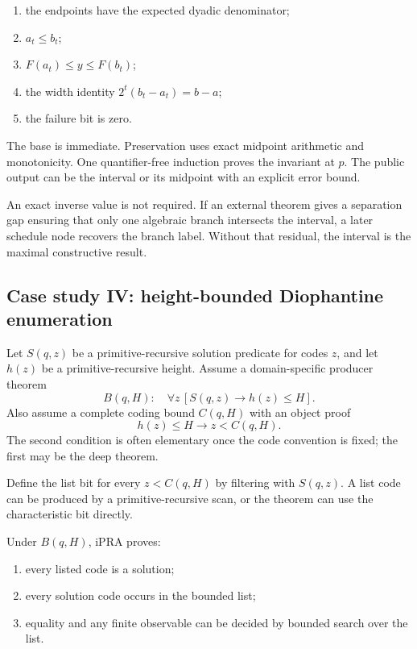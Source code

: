 \begin{enumerate}
\item the endpoints have the expected dyadic denominator;
\item \(a_t\le b_t\);
\item \(F(a_t)\le y\le F(b_t)\);
\item the width identity \(2^t(b_t-a_t)=b-a\);
\item the failure bit is zero.
\end{enumerate}

The base is immediate.  Preservation uses exact midpoint arithmetic and monotonicity.  One
quantifier-free induction proves the invariant at \(p\).  The public output can be the interval or
its midpoint with an explicit error bound.

An exact inverse value is not required.  If an external theorem gives a separation gap ensuring that
only one algebraic branch intersects the interval, a later schedule node recovers the branch label.
Without that residual, the interval is the maximal constructive result.

\subsection{Case study IV: height-bounded Diophantine enumeration}\label{subsec:height}

Let \(S(q,z)\) be a primitive-recursive solution predicate for codes \(z\), and let
\(h(z)\) be a primitive-recursive height.  Assume a domain-specific producer theorem
\[
 B(q,H):\quad \forall z\,[S(q,z)\to h(z)\le H].
\]
Also assume a complete coding bound \(C(q,H)\) with an object proof
\[
 h(z)\le H\to z<C(q,H).
\]
The second condition is often elementary once the code convention is fixed; the first may be the
deep theorem.

Define the list bit for every \(z<C(q,H)\) by filtering with \(S(q,z)\).  A list code can be produced
by a primitive-recursive scan, or the theorem can use the characteristic bit directly.

\begin{theorem}\label{thm:complete-list}
Under \(B(q,H)\), iPRA proves:
\begin{enumerate}
\item every listed code is a solution;
\item every solution code occurs in the bounded list;
\item equality and any finite observable can be decided by bounded search over the list.
\end{enumerate}
\end{theorem}


